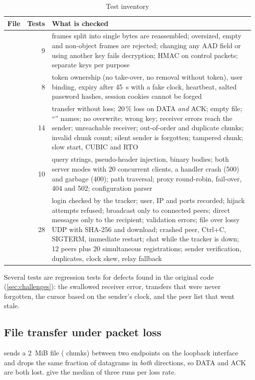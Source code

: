 \begin{table}[H]\centering\footnotesize
\caption{Test inventory}\label{tab:tests}
\begin{tabularx}{\textwidth}{@{}l r Y@{}}
\toprule
\textbf{File} & \textbf{Tests} & \textbf{What is checked} \\
\midrule
{} & 9 & frames split into single bytes are reassembled; oversized, empty and non-object frames are rejected; changing any AAD field or using another key fails decryption; HMAC on control packets; separate keys per purpose \\
 & 8 & token ownership (no take-over, no removal without token), user binding, expiry after \SI{45}{s} with a fake clock, heartbeat, salted password hashes, session cookies cannot be forged \\
 & 14 & transfer without loss; 20\,\% loss on DATA \emph{and} ACK; empty file; ``'' names; no overwrite; wrong key; receiver errors reach the sender; unreachable receiver; out-of-order and duplicate chunks; invalid chunk count; silent sender is forgotten; tampered chunk; slow start, CUBIC and RTO \\
 & 10 & query strings, pseudo-header injection, binary bodies; both server modes with 20 concurrent clients, a handler crash (500) and garbage (400); path traversal; proxy round-robin, fail-over, 404 and 502; configuration parser \\
 & 28 & login checked by the tracker; user, IP and ports recorded; hijack attempts refused; broadcast only to connected peers; direct messages only to the recipient; validation errors; file over lossy UDP with SHA-256 and download; crashed peer, Ctrl+C, SIGTERM, immediate restart; chat while the tracker is down; 12 peers plus 20 simultaneous registrations; sender verification, duplicates, clock skew, relay fallback \\
\bottomrule
\end{tabularx}
\end{table}

Several tests are regression tests for defects found in the original code (\cref{sec:challenges}):
the swallowed receiver error, transfers that were never forgotten, the cursor based on the sender's
clock, and the peer list that went stale.

\subsection{File transfer under packet loss}
 sends a \SI{2}{MiB} file (\FactChunks{} chunks) between two endpoints on the
loopback interface and drops the same fraction of datagrams in \emph{both} directions, so DATA and
ACK are both lost.  give the median of three runs per loss rate.

